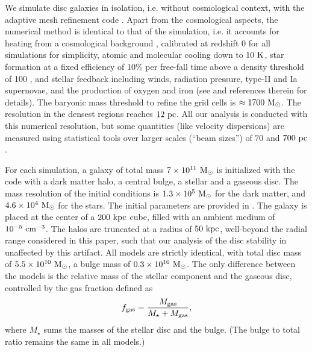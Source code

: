 \documentclass[useAMS,usenatbib]{mnras}
\newcommand{\fgas}{\ensuremath{f_{\rm gas}}\xspace}
\begin{document}
We simulate disc galaxies in isolation, i.e. without cosmological context, with the adaptive mesh refinement code \ramses \citep{Teyssier2002}. Apart from the cosmological aspects, the numerical method is identical to that of the \vintergatan simulation, i.e. it accounts for heating from a cosmological background \citep{Haardt1996}, calibrated at redshift 0 for all simulations for simplicity, atomic and molecular cooling down to $10 \mathrm{~K}$, star formation at a fixed efficiency of 10\% per free-fall time above a density threshold of 100 \cc, and stellar feedback including winds, radiation pressure, type-II and Ia supernovae, and the production of oxygen and iron (see \citealt{Agertz2021} and references therein for details). The baryonic mass threshold to refine the grid cells is $\approx 1700 \mathrm{~M}_{\odot}$. The resolution in the densest regions reaches $12 \mathrm{~pc}$. All our analysis is conducted with this numerical resolution, but some quantities (like velocity dispersions) are measured using statistical tools over larger scales (``beam sizes'') of $70$ and $700 \mathrm{~pc}$.

For each simulation, a galaxy of total mass $7\times 10^{11} \mathrm{~M}_{\odot}$ is initialized with the \magi code \citep{Miki2018} with a dark matter halo, a central bulge, a stellar and a gaseous disc. The mass resolution of the initial conditions is $1.3\times 10^{5} \mathrm{~M}_{\odot}$ for the dark matter, and $4.6\times 10^{4} \mathrm{~M}_{\odot}$ for the stars. The initial parameters are provided in . The galaxy is placed at the center of a $200 \mathrm{~kpc}$ cube, filled with an ambient medium of $10^{-5} \mathrm{~cm^{-3}}$. The halos are truncated at a radius of $50 \mathrm{~kpc}$, well-beyond the radial range considered in this paper, such that our analysis of the disc stability in unaffected by this artifact. All models are strictly identical, with total disc mass of $5.5\times 10^{10} \mathrm{~M}_{\odot}$, a bulge mass of $0.3\times 10^{10}\mathrm{~M}_{\odot}$. The only difference between the models is the relative mass of the stellar component and the gaseous disc, controlled by the gas fraction defined as
\begin{equation}
\fgas = \frac{M_{\rm gas}}{M_{\star} + M_{\rm gas}},
\end{equation}
where $M_{\star}$ sums the masses of the stellar disc and the bulge. (The bulge to total ratio remains the same in all models.)
\end{document}
